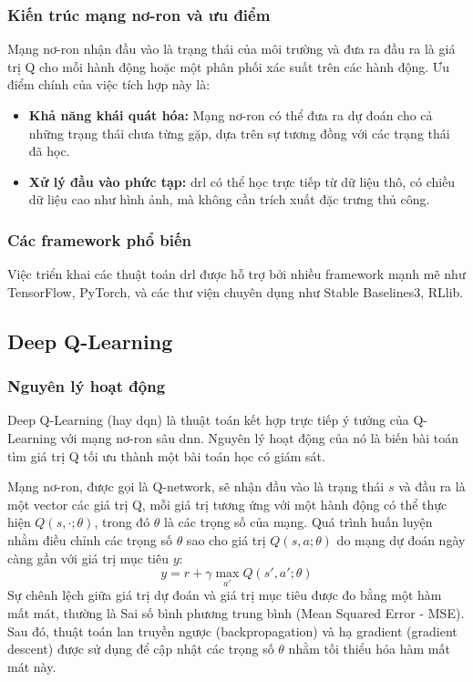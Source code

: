 \subsubsection{Kiến trúc mạng nơ-ron và ưu điểm}
Mạng nơ-ron nhận đầu vào là trạng thái của môi trường và đưa ra đầu ra là giá trị
Q cho mỗi hành động hoặc một phân phối xác suất trên các hành động. Ưu điểm
chính của việc tích hợp này là:
\begin{itemize}
    \item \textbf{Khả năng khái quát hóa:} Mạng nơ-ron có thể đưa ra dự đoán cho
        cả những trạng thái chưa từng gặp, dựa trên sự tương đồng với các trạng thái
        đã học.

    \item \textbf{Xử lý đầu vào phức tạp:} \ac{drl} có thể học trực tiếp từ dữ liệu
        thô, có chiều dữ liệu cao như hình ảnh, mà không cần trích xuất đặc trưng
        thủ công.
\end{itemize}

\subsubsection{Các framework phổ biến}
Việc triển khai các thuật toán \ac{drl} được hỗ trợ bởi nhiều framework mạnh mẽ như
TensorFlow, PyTorch, và các thư viện chuyên dụng như Stable Baselines3, RLlib.

\subsection{Deep Q-Learning}
\subsubsection{Nguyên lý hoạt động}
Deep Q-Learning (hay \ac{dqn}) là thuật toán kết hợp trực tiếp ý tưởng của Q-Learning
với mạng nơ-ron sâu \ac{dnn}. Nguyên lý hoạt động của nó là biến bài toán tìm giá
trị Q tối ưu thành một bài toán học có giám sát.

Mạng nơ-ron, được gọi là Q-network, sẽ nhận đầu vào là trạng thái $s$ và đầu ra là
một vector các giá trị Q, mỗi giá trị tương ứng với một hành động có thể thực
hiện $Q(s, \cdot; \theta)$, trong đó $\theta$ là các trọng số của mạng. Quá
trình huấn luyện nhằm điều chỉnh các trọng số $\theta$ sao cho giá trị
$Q(s, a; \theta)$ do mạng dự đoán ngày càng gần với giá trị mục tiêu $y$:
\begin{equation}
    y = r + \gamma \max_{a'}Q(s', a'; \theta)
\end{equation}
Sự chênh lệch giữa giá trị dự đoán và giá trị mục tiêu được đo bằng một hàm mất mát,
thường là Sai số bình phương trung bình (Mean Squared Error - MSE). Sau đó,
thuật toán lan truyền ngược (backpropagation) và hạ gradient (gradient descent)
được sử dụng để cập nhật các trọng số $\theta$ nhằm tối thiểu hóa hàm mất mát
này.

